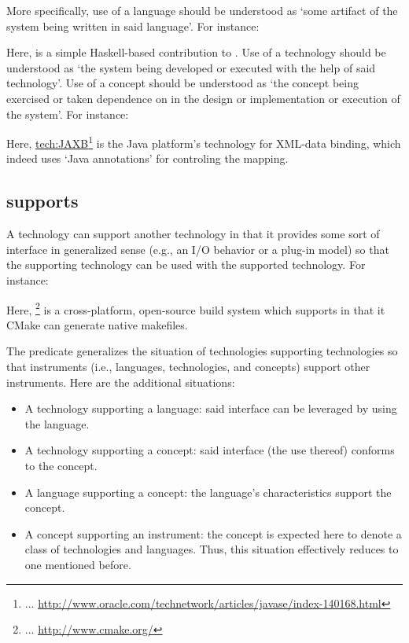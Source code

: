More specifically, use of a language should be understood as `some
artifact of the system being written in said language'. For instance:


\noindent
Here,  is a simple Haskell-based contribution
to \ooo{}. Use of a technology should be understood as `the system
being developed or executed with the help of said technology'. Use of
a concept should be understood as `the concept being exercised or
taken dependence on in the design or implementation or execution of
the system'. For instance:


\noindent
Here, \url{tech:JAXB}\footnote{... 
  \url{http://www.oracle.com/technetwork/articles/javase/index-140168.html}}
is the Java platform's technology for XML-data binding, which indeed
uses `Java annotations' for controling the mapping.


\subsection{supports}
\label{S:supports}

A technology can support another technology in that it provides some
sort of interface in generalized sense (e.g., an I/O behavior or a
plug-in model) so that the supporting technology can be used with the
supported technology. For instance:


\noindent
Here, \footnote{... 
  \url{http://www.cmake.org/}} is a cross-platform, open-source build
system which supports  in that it CMake can generate
native makefiles.

The predicate  generalizes the situation of
technologies supporting technologies so that instruments (i.e.,
languages, technologies, and concepts) support other instruments. Here
are the additional situations:
%
\begin{itemize}
\item A technology supporting a language: said interface can be
  leveraged by using the language.
\item A technology supporting a concept: said interface (the use
  thereof) conforms to the concept.
\item A language supporting a concept: the language's characteristics
  support the concept.
\item A concept supporting an instrument: the concept is expected here
  to denote a class of technologies and languages. Thus, this
  situation effectively reduces to one mentioned before.
\end{itemize}

